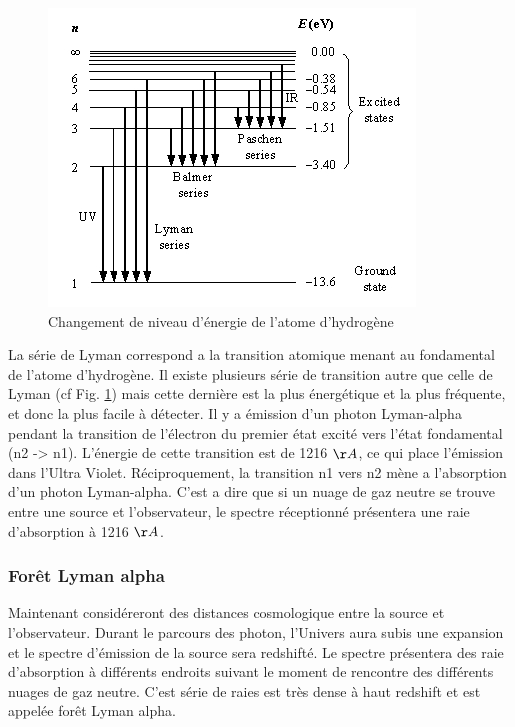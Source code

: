 \begin{figure}
\centering
        \includegraphics[width=.9\textwidth]{img/01/lyman.jpg} 
        \caption[Raies de l'hydrogène]{Changement de niveau d'énergie de l'atome d'hydrogène}
 		\label{fig:lyman}
\end{figure}

La série de Lyman correspond a la transition atomique menant au fondamental de l'atome d'hydrogène.
Il existe plusieurs série de transition autre que celle de Lyman (cf Fig. \ref{fig:lyman}) mais cette dernière est la plus énergétique et la plus fréquente, et donc la plus facile à détecter.
Il y a émission d'un photon Lyman-alpha pendant la transition de l'électron du premier état excité vers l’état fondamental (n2 -> n1).
L'énergie de cette transition est de 1216 $\AA$,  ce qui place l’émission dans l'Ultra Violet.
Réciproquement, la transition n1 vers n2 mène a l'absorption d'un photon Lyman-alpha.
C'est a dire que si un nuage de gaz neutre se trouve entre une source et l'observateur, le spectre réceptionné présentera une raie d'absorption à 1216 $\AA$.

\subsubsection*{Forêt Lyman alpha}

Maintenant considéreront des distances cosmologique entre la source et l'observateur.
Durant le parcours des photon, l'Univers aura subis une expansion et le spectre d'émission de la source sera redshifté.
Le spectre présentera des raie d’absorption à différents endroits suivant le moment de rencontre des différents nuages de gaz neutre.
C'est série de raies est très dense à haut redshift et est appelée forêt Lyman alpha.


